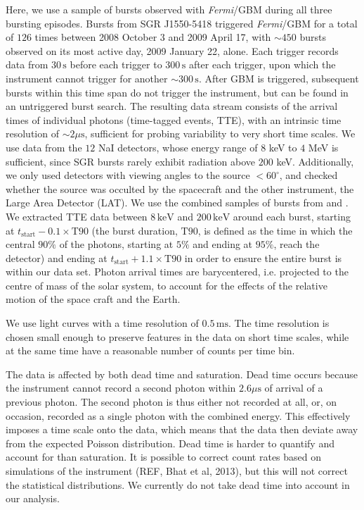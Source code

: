 \documentclass[12pt]{emulateapj}
\newcommand{\project}[1]{\textsl{#1}}
\newcommand{\fermi}{\project{Fermi}}
\begin{document}
Here, we use a sample of bursts observed with {\it Fermi}/GBM during all three bursting episodes. Bursts from SGR J1550-5418 triggered \fermi/GBM for a total of $126$ 
times between 2008 October 3 and 2009 April 17, with $\sim 450$ bursts observed on its most active day, 2009 January 22, alone. 
Each trigger records data from $30\,\mathrm{s}$ before each trigger to $300\,\mathrm{s}$ after each trigger, upon which the instrument cannot trigger for another $\sim 300 \,\mathrm{s}$. 
After GBM is triggered, subsequent bursts within this time span do not trigger the instrument, but can be found in an untriggered burst search. The resulting data stream consists of 
the arrival times of individual photons (time-tagged events, TTE), with an intrinsic time resolution of $\sim 2\mu\mathrm{s}$, sufficient for probing variability to very short time scales.
We use data from the $12$ NaI detectors, whose energy range of $8$ keV to $4$ MeV is sufficient, since SGR bursts rarely exhibit radiation above $200$ keV. Additionally, we only used detectors with viewing angles to the source $< 60^{\circ}$, and checked whether the source was occulted by the spacecraft and the other instrument, the Large Area Detector (LAT). We use the combined samples of bursts from \citet{vonkienlin2012} and \citet{vanderhorst2012}. 
We extracted TTE data between $8 \, \mathrm{keV}$ and $200 \, \mathrm{keV}$ around each burst, starting at $t_{\mathrm{start}} - 0.1 \times\mathrm{T}90$ (the burst duration, $\mathrm{T}90$, is defined as the time in which the central $90\%$ of the photons, starting at $5\%$ and ending at $95\%$, reach the detector) and ending at $t_{\mathrm{start}} + 1.1\times\mathrm{T}90$ in order to ensure the entire burst is within our data set. Photon arrival times are barycentered, i.e. projected to the centre of mass of the solar system, to account for the effects of the relative motion of the space craft and the Earth.

We use light curves with a time resolution of $0.5\,\mathrm{ms}$. The time resolution is chosen small enough to preserve features
in the data on short time scales, while at the same time have a reasonable number of counts per time bin. 

The data is affected by both dead time and saturation. 
Dead time occurs because the instrument cannot record a second photon within $2.6\mu\mathrm{s}$ of arrival of a previous photon. 
The second photon is thus either not recorded at all, or, on occasion, recorded as a single photon with the combined energy. This effectively 
imposes a time scale onto the data, which means that the data then deviate away from the expected Poisson distribution. 
Dead time is harder to quantify and account for than saturation. It is possible to correct count rates based on simulations of the instrument (REF, Bhat et al, 2013),
but this will not correct the statistical distributions. We currently do not take dead time into account in our analysis. 
\end{document}
